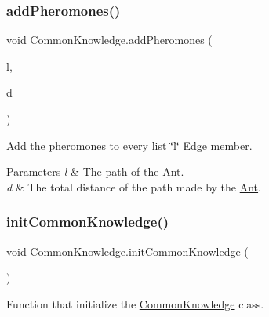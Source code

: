 \subsubsection{\texorpdfstring{add\+Pheromones()}{addPheromones()}}
{\footnotesize\ttfamily void Common\+Knowledge.\+add\+Pheromones (\begin{DoxyParamCaption}\item[{List$<$ \hyperlink{classEdgeAntColonyData}{Edge\+Ant\+Colony\+Data} $>$}]{l,  }\item[{float}]{d }\end{DoxyParamCaption})\hspace{0.3cm}{\ttfamily [inline]}}



Add the pheromones to every list \char`\"{}l\char`\"{} \hyperlink{classEdge}{Edge} member. 


\begin{DoxyParams}{Parameters}
{\em l} & The path of the \hyperlink{classAnt}{Ant}.\\
\hline
{\em d} & The total distance of the path made by the \hyperlink{classAnt}{Ant}.\\
\hline
\end{DoxyParams}
\mbox{\label{classCommonKnowledge_a02951b11f4a27b4b2a99b4b82a57f467}} 
\subsubsection{\texorpdfstring{init\+Common\+Knowledge()}{initCommonKnowledge()}}
{\footnotesize\ttfamily void Common\+Knowledge.\+init\+Common\+Knowledge (\begin{DoxyParamCaption}{ }\end{DoxyParamCaption})\hspace{0.3cm}{\ttfamily [inline]}}



Function that initialize the \hyperlink{classCommonKnowledge}{Common\+Knowledge} class. 

\mbox{\label{classCommonKnowledge_a1ee7ccaca706571bb8a5db625d57413e}} 
